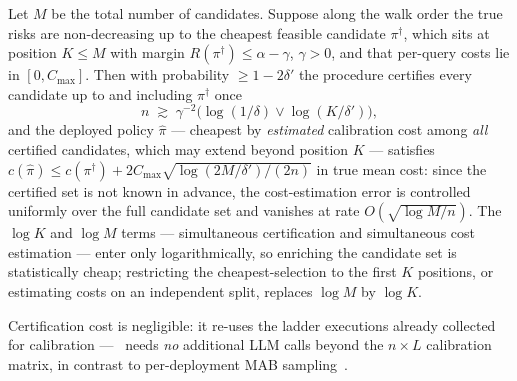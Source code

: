 \begin{proposition}
\label{prop:consistency}
Let $M$ be the total number of candidates. Suppose along the walk order
the true risks are non-decreasing up to the
cheapest feasible candidate $\pi^\dagger$, which sits at position
$K \le M$
with margin $R(\pi^\dagger) \le \alpha - \gamma$, $\gamma > 0$, and that
per-query costs lie in $[0, C_{\max}]$. Then with probability
$\ge 1 - 2\delta'$ the procedure certifies every candidate up to and
including $\pi^\dagger$ once
\[
n \;\gtrsim\; \gamma^{-2}\big(\log(1/\delta) \vee \log(K/\delta')\big),
\]
and the deployed policy $\hat\pi$ --- cheapest by \emph{estimated}
calibration cost among \emph{all} certified candidates, which may
extend beyond position $K$ --- satisfies
$c(\hat\pi) \le c(\pi^\dagger)
+ 2 C_{\max}\sqrt{\log(2M/\delta')/(2n)}$
in true mean cost: since the certified set is not known in advance,
the cost-estimation error is controlled uniformly over the full
candidate set and vanishes at rate
$O(\sqrt{\log M / n})$. The $\log K$ and $\log M$ terms ---
simultaneous certification and simultaneous cost estimation --- enter
only logarithmically, so enriching the candidate set is statistically
cheap; restricting the cheapest-selection to the first $K$ positions,
or estimating costs on an independent split, replaces $\log M$ by
$\log K$.
\end{proposition}

Certification cost is negligible: it re-uses the ladder executions already
collected for calibration --- \system\ needs \emph{no} additional LLM calls
beyond the $n \times L$ calibration matrix, in contrast to per-deployment
MAB sampling~\cite{russo2025abacus}.
